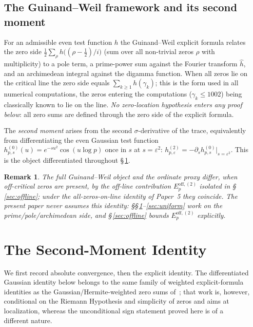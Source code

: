 \documentclass[11pt]{article}
\newtheorem*{remark}{Remark}
\newcommand{\Eoff}{E_p^{\mathrm{off},(2)}}  %
\begin{document}
\subsection{The Guinand--Weil framework and its second moment}

For an admissible even test function $h$ the Guinand--Weil explicit formula
\cite[Thm.~5.12]{IwaniecKowalski04} relates the zero side
$\tfrac12\sum_{\rho}h\bigl((\rho-\tfrac12)/i\bigr)$ (sum over all
non-trivial zeros $\rho$ with multiplicity) to a pole term, a prime-power
sum against the Fourier transform $\widehat h$, and an archimedean integral
against the digamma function.
When all zeros lie on the critical line the zero side equals
$\sum_{k\ge 1}h(\gamma_k)$; this is the form used in all numerical
computations, the zeros entering the computations ($\gamma_k\le 1002$) being
classically known to lie on the line.
\emph{No zero-location hypothesis enters any proof below}: all zero sums are
defined through the zero side of the explicit formula.

The \emph{second moment} arises from the second $\sigma$-derivative of the
trace, equivalently from differentiating the even Gaussian test function
$h^{(0)}_{p,s}(u)=e^{-s u^2}\cos(u\log p)$ once in $s$ at $s=\varepsilon^2$:
$h^{(2)}_{p,\varepsilon}=-\partial_s h^{(0)}_{p,s}|_{s=\varepsilon^2}$.
This is the object differentiated throughout \S\,\ref{sec:id}.

\begin{remark}
The full Guinand--Weil object and the ordinate proxy differ, when
off-critical zeros are present, by the off-line contribution
$\Eoff$ isolated in \S\,\ref{sec:offline}; under the all-zeros-on-line
identity of Paper~5 they coincide.
The present paper never assumes this identity: \S\S\,\ref{sec:id}--\ref{sec:uniform}
work on the prime/pole/archimedean side, and \S\,\ref{sec:offline} bounds
$\Eoff$ explicitly.
\end{remark}

\section{The Second-Moment Identity}
\label{sec:id}

We first record absolute convergence, then the explicit identity. The
differentiated Gaussian identity below belongs to the same family of
weighted explicit-formula identities as the Gaussian/Hermite-weighted zero
sums of~\cite{BalanzarioCardenas23}; that work is, however, conditional on
the Riemann Hypothesis and simplicity of zeros and aims at localization,
whereas the unconditional sign statement proved here is of a different
nature.
\end{document}
